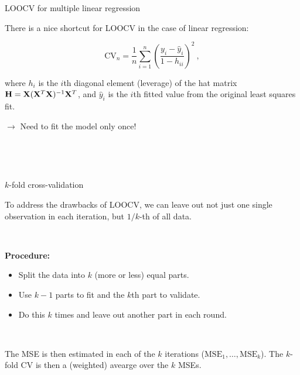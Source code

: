 \documentclass[
  10pt,
  ignorenonframetext,
]{beamer}
\providecommand{\tightlist}{%
  \setlength{\itemsep}{0pt}\setlength{\parskip}{0pt}}
\begin{document}
\begin{frame}
\begin{block}{LOOCV for multiple linear regression}
\protect\hypertarget{loocv-for-multiple-linear-regression}{}
\vspace{2mm}

There is a nice shortcut for LOOCV in the case of linear regression:

\[ \text{CV}_{n}=\frac{1}{n}\sum_{i=1}^n \left( \frac{y_i-\hat{y}_i}{1-h_{ii}} \right) ^2 \ ,\]

where \(h_i\) is the \(i\)th diagonal element (leverage) of the hat
matrix \({\bf H}={\bf X}({\bf X}^T{\bf X})^{-1}{\bf X}^T\), and
\(\hat{y}_i\) is the \(i\)th fitted value from the original least
squares fit.

\vspace{2mm}

\(\rightarrow\) Need to fit the model only once!

\(~\)

\(~\)
\end{block}
\end{frame}

\begin{frame}
\begin{block}{\(k\)-fold cross-validation}
\protect\hypertarget{k-fold-cross-validation}{}
\(~\)

To address the drawbacks of LOOCV, we can leave out not just one single
observation in each iteration, but \(1/k\)-th of all data.

\(~\)

\textbf{Procedure:}

\begin{itemize}
\tightlist
\item
  Split the data into \(k\) (more or less) equal parts.
\end{itemize}

\vspace{2mm}

\begin{itemize}
\tightlist
\item
  Use \(k-1\) parts to fit and the \(k\)th part to validate.
\end{itemize}

\vspace{2mm}

\begin{itemize}
\tightlist
\item
  Do this \(k\) times and leave out another part in each round.
\end{itemize}

\(~\)

The MSE is then estimated in each of the \(k\) iterations
(\(\text{MSE}_1,\ldots,\text{MSE}_k\)). The \(k\)-fold CV is then a
(weighted) avearge over the \(k\) MSEs.
\end{block}
\end{frame}
\end{document}
